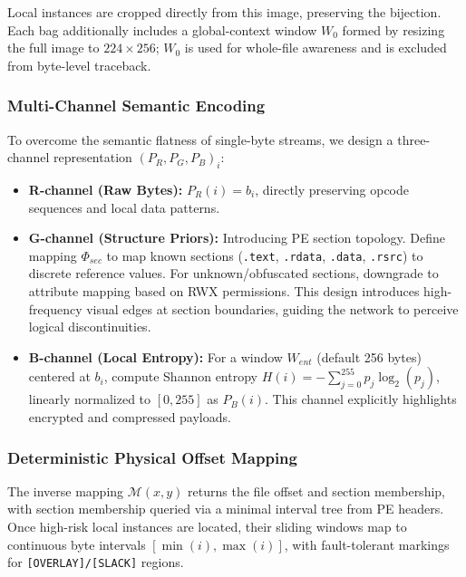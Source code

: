 \documentclass[runningheads]{llncs}
\begin{document}
Local instances are cropped directly from this image, preserving the bijection. Each bag additionally includes a global-context window $W_0$ formed by resizing the full image to $224\times256$; $W_0$ is used for whole-file awareness and is excluded from byte-level traceback.

\subsubsection{Multi-Channel Semantic Encoding}
To overcome the semantic flatness of single-byte streams, we design a three-channel representation $(P_R, P_G, P_B)_i$:
\begin{itemize}
    \item \textbf{R-channel (Raw Bytes):} $P_R(i) = b_i$, directly preserving opcode sequences and local data patterns.
    \item \textbf{G-channel (Structure Priors):} Introducing PE section topology. Define mapping $\Phi_{sec}$ to map known sections (\texttt{.text}, \texttt{.rdata}, \texttt{.data}, \texttt{.rsrc}) to discrete reference values. For unknown/obfuscated sections, downgrade to attribute mapping based on RWX permissions. This design introduces high-frequency visual edges at section boundaries, guiding the network to perceive logical discontinuities.
    \item \textbf{B-channel (Local Entropy):} For a window $W_{ent}$ (default 256 bytes) centered at $b_i$, compute Shannon entropy $H(i) = -\sum_{j=0}^{255} p_j \log_2(p_j)$, linearly normalized to $[0,255]$ as $P_B(i)$. This channel explicitly highlights encrypted and compressed payloads.
\end{itemize}

\subsubsection{Deterministic Physical Offset Mapping}
The inverse mapping $\mathcal{M}(x,y)$ returns the file offset and section membership, with section membership queried via a minimal interval tree from PE headers. Once high-risk local instances are located, their sliding windows map to continuous byte intervals $[\min(i), \max(i)]$, with fault-tolerant markings for \texttt{[OVERLAY]/[SLACK]} regions.
\end{document}
